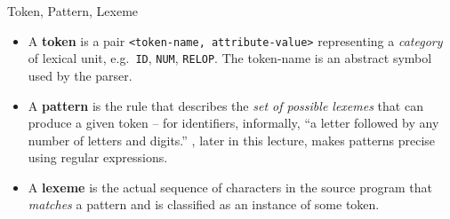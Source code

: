 \documentclass[full-course-notes.tex]{subfiles}
\begin{document}
\begin{defbox}{Token, Pattern, Lexeme}
\begin{itemize}
  \item A \textbf{token} is a pair \texttt{<token-name, attribute-value>} representing a
  \emph{category} of lexical unit, e.g.\ \texttt{ID}, \texttt{NUM}, \texttt{RELOP}. The
  token-name is an abstract symbol used by the parser.
  \item A \textbf{pattern} is the rule that describes the \emph{set of possible lexemes} that
  can produce a given token -- for identifiers, informally, ``a letter followed by any number of
  letters and digits.'' , later in this lecture, makes patterns
  precise using regular expressions.
  \item A \textbf{lexeme} is the actual sequence of characters in the source program that
  \emph{matches} a pattern and is classified as an instance of some token.
\end{itemize}
\end{defbox}

\begin{center}
\end{center}
\end{document}
